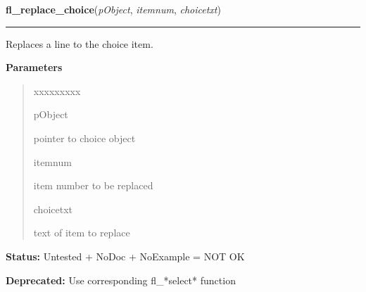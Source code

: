 \hspace{.8\funcindent}\begin{boxedminipage}{\funcwidth}

    \raggedright \textbf{fl\_replace\_choice}(\textit{pObject}, \textit{itemnum}, \textit{choicetxt})

    \vspace{-1.5ex}

    \rule{\textwidth}{0.5\fboxrule}
\setlength{\parskip}{2ex}
    Replaces a line to the choice item.

\setlength{\parskip}{1ex}
      \textbf{Parameters}
      \vspace{-1ex}

      \begin{quote}
        \begin{Ventry}{xxxxxxxxx}

          \item[pObject]

          pointer to choice object

          \item[itemnum]

          item number to be replaced

          \item[choicetxt]

          text of item to replace

        \end{Ventry}

      \end{quote}

\textbf{Status:} Untested + NoDoc + NoExample = NOT OK



\textbf{Deprecated:} Use corresponding fl\_*select* function



    \end{boxedminipage}

    \label{xformslib:deprecated:fl_delete_choice}

    \vspace{0.5ex}

